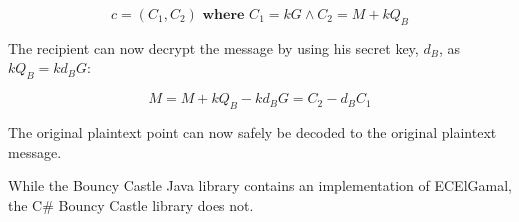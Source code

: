 \begin{equation}
	c = (C_1, C_2)  \textbf{ where }  C_1 = kG \land C_2 = M+kQ_B
\end{equation}

The recipient can now decrypt the message by using his secret key, \(d_B\), as \(kQ_B = kd_BG\):

\begin{equation}
	M = M + k Q_B - k d_B G = C_2 - d_B C_1
\end{equation}

The original plaintext point can now safely be decoded to the original plaintext message.\cite{hankerson2010}

While the Bouncy Castle Java library contains an implementation of ECElGamal, the C\# Bouncy Castle library does not.